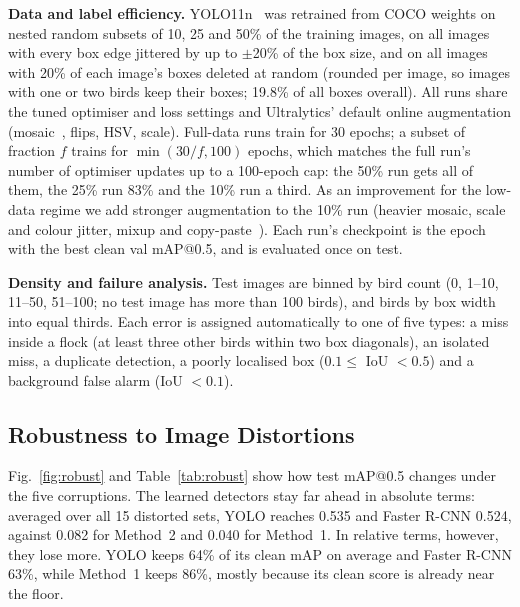 \textbf{Data and label efficiency.} YOLO11n~\cite{ultralytics2024yolo11} was retrained from COCO
weights on nested random subsets of 10, 25 and 50\% of the training images, on all images with
every box edge jittered by up to $\pm$20\% of the box size, and on all images with 20\% of each image's boxes
deleted at random (rounded per image, so images with one or two birds keep their boxes;
19.8\% of all boxes overall). All runs share the tuned optimiser and loss settings and Ultralytics' default online
augmentation (mosaic~\cite{bochkovskiy2020yolov4}, flips, HSV, scale). Full-data runs train for 30 epochs; a subset of
fraction $f$ trains for $\min(30/f, 100)$ epochs, which matches the full run's number of
optimiser updates up to a 100-epoch cap: the 50\% run gets all of them, the 25\% run 83\% and
the 10\% run a third. As an improvement for the low-data regime we add stronger augmentation to the
10\% run (heavier mosaic, scale and colour jitter, mixup and copy-paste~\cite{ghiasi2021copypaste}).
Each run's checkpoint is the epoch with the best clean val mAP@0.5, and is evaluated once on test.

\textbf{Density and failure analysis.} Test images are binned by bird count (0, 1--10, 11--50,
51--100; no test image has more than 100 birds), and birds by box width into equal thirds. Each
error is assigned automatically to one of five types: a miss inside a flock (at least three
other birds within two box diagonals), an isolated miss, a duplicate detection, a poorly
localised box ($0.1\le$ IoU $<0.5$) and a background false alarm (IoU $<0.1$).

\subsection{Robustness to Image Distortions}
\label{sec:res-robust}

Fig.~\ref{fig:robust} and Table~\ref{tab:robust} show how test mAP@0.5 changes under the five
corruptions. The learned detectors stay far ahead in absolute terms: averaged over all 15
distorted sets, YOLO reaches 0.535 and Faster R-CNN 0.524, against 0.082 for Method~2 and 0.040
for Method~1. In relative terms, however, they lose more. YOLO keeps 64\% of its clean mAP on
average and Faster R-CNN 63\%, while Method~1 keeps 86\%, mostly because its clean score is
already near the floor.

